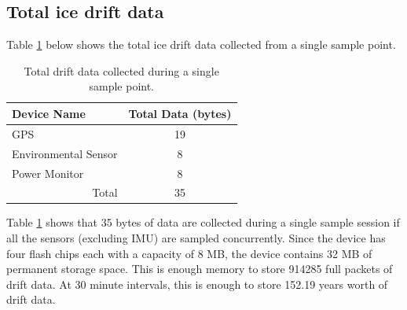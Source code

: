 \begin{table}[H]
	\centering
	\caption{Description of output values from INA219 current sensor.}
	\setlength{\extrarowheight}{5pt}
	
	\label{tab:INA_Output}
\end{table}


\subsection{Total ice drift data}
Table \ref{tab:total_data} below shows the total ice drift data collected from a single sample point.

\begin{table}[H]
	\caption{Total drift data collected during a single sample point.}
	\setlength{\extrarowheight}{5pt}
	\centering
	\begin{tabular}{lc}
		\hline
		\textbf{Device Name}   &  \textbf{Total Data (bytes)}\\
		\hline
		\hline
		GPS  & 19 \\
		\hline
		Environmental Sensor & 8 \\
		\hline
		Power Monitor & 8\\
		\hline
		\hline
		\multicolumn{1}{r}{Total} & \multicolumn{1}{c}{35}\\
		\cline{2-2}
		\cline{2-2}
	\end{tabular}
	\label{tab:total_data}
\end{table}

Table \ref{tab:total_data} shows that 35 bytes of data are collected during a single sample session if all the sensors (excluding IMU) are sampled concurrently. Since the device has four flash chips each with a capacity of 8 MB, the device contains 32 MB of permanent storage space. This is enough memory to store 914285 full packets of drift data. At 30 minute intervals, this is enough to store 152.19 years worth of drift data. 
